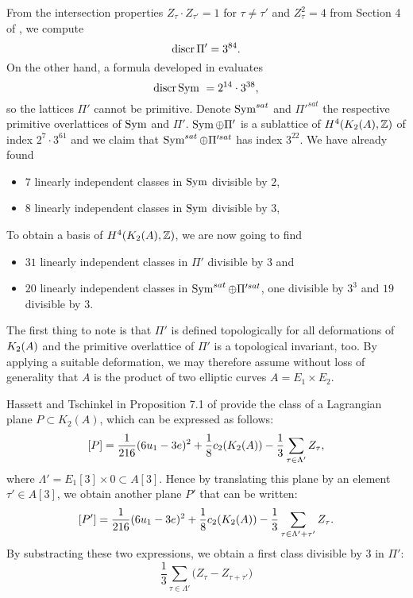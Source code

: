 From the intersection properties $Z_\tau \cdot Z_{\tau'} = 1$ for $\tau\neq \tau'$ and $Z_\tau^2 = 4$ from Section 4 of \cite{Hassett}, we compute
\begin{equation}
 \operatorname{discr} \Pi' = 3^{84}.
 \label{discrPi}
\end{equation}
On the other hand, a formula developed in \cite{Kapfer} evaluates
\begin{equation} \label{DiscrSym}
\operatorname{discr} \operatorname{Sym} \ = 2^{14}\cdot 3^{38},
\end{equation}
so the lattices $\Pi'$ cannot be primitive. Denote $\operatorname{Sym}^{sat}$ and $\Pi'^{sat}$ the respective primitive overlattices of $\operatorname{Sym}$ and $\Pi'$. $\operatorname{Sym} \oplus\Pi'$ is a sublattice of $H^4(K_{ 2 }( A ),\mathbb{Z})$ of index $2^{7}\cdot 3^{61}$ and we claim that $\operatorname{Sym}^{sat}\oplus \Pi'^{sat}$ has index $3^{22}$. 
We have already found
\begin{itemize}
 \item $7$ linearly independent classes in $\operatorname{Sym}$ divisible by $2$,
 \item $8$ linearly independent classes in $\operatorname{Sym}$ divisible by $3$,
\end{itemize}
To obtain a basis of $H^4(K_{ 2 }( A ),\mathbb{Z})$, 
we are now going to find
\begin{itemize}
 \item $31$ linearly independent classes in $\Pi'$ divisible by $3$ and
 \item $20$ linearly independent classes in $\operatorname{Sym}^{sat}\oplus \Pi'^{sat}$, one divisible by $3^3$ and $19$ divisible by $3$.
\end{itemize}


The first thing to note is that $\Pi'$ is defined topologically for all deformations of $K_{ 2 }( A )$ and the primitive overlattice of $\Pi'$ is a topological invariant, too.  
By applying a suitable deformation, we may therefore assume without loss of generality that $A$ is the product of two elliptic curves $A=E_1\times E_2$. 

Hassett and Tschinkel in Proposition 7.1 of \cite{Hassett} provide the class of a Lagrangian plane $P\subset K_2(A)$, which can be expressed as follows:
\begin{equation}
\left[P\right]=\frac{1}{216}(6u_1-3e)^2+\frac{1}{8}c_2(K_{ 2 }( A ))-\frac{1}{3}\sum_{\tau\in \Lambda'} Z_{\tau},
\label{LagrangianPlaneClass}
\end{equation}
where $\Lambda'=E_1[3]\times 0\subset A[3]$.
Hence by translating this plane by an element $\tau'\in A[3]$, we obtain another plane $P'$ that can be written:
$$\left[P'\right]=\frac{1}{216}(6u_1-3e)^2+\frac{1}{8}c_2(K_{ 2 }( A ))-\frac{1}{3}\sum_{\tau\in \Lambda'+\tau'} Z_{\tau}.$$
By substracting these two expressions, we obtain a first class divisible by 3 in $\Pi'$:
\begin{equation}
 \frac{1}{3}\sum_{\tau\in\Lambda'} \Big(Z_{\tau} - Z_{\tau+\tau'}\Big)
 \label{first31}
\end{equation}

